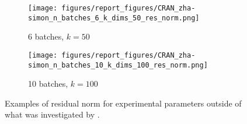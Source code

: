 \begin{figure}[h]
  \centering
  \begin{subfigure}[b]{0.4\textwidth}
    \centering
    \texttt{[image: figures/report\_figures/CRAN\_zha-simon\_n\_batches\_6\_k\_dims\_50\_res\_norm.png]}
    \caption{6 batches, $k=50$}
  \end{subfigure}
  \begin{subfigure}[b]{0.4\textwidth}
    \centering
    \texttt{[image: figures/report\_figures/CRAN\_zha-simon\_n\_batches\_10\_k\_dims\_100\_res\_norm.png]}
    \caption{10 batches, $k=100$}
  \end{subfigure}
  \caption{Examples of residual norm for experimental parameters outside of what was investigated by \cite{Kalantzis2021}.}
  \label{fig:cran_variations}
\end{figure}
